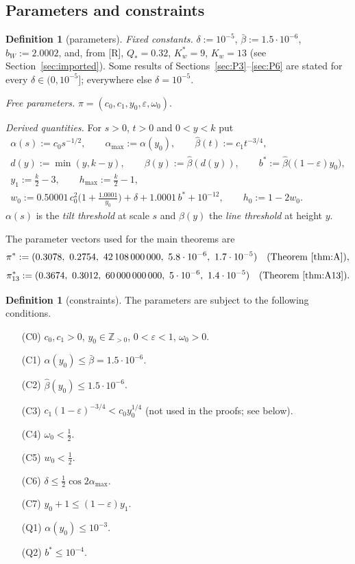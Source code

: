 \documentclass[11pt]{amsart}
\newcommand{\Z}{\mathbb Z}
\newcommand{\amax}{\alpha_{\max}}
\newcommand{\hmax}{h_{\max}}
\theoremstyle{definition}
\newtheorem{definition}[theorem]{Definition}
\theoremstyle{remark}
\numberwithin{equation}{section}
\begin{document}
\subsection{Parameters and constraints}\label{ssec:flows-params}

\begin{definition}[parameters]\label{def:flows-params}
\emph{Fixed constants.} $\delta:=10^{-5}$, $\bar\beta:=1.5\cdot10^{-6}$, $b_W:=2.0002$, and, from [R],
$Q_*=0.32$, $K_w^*=9$, $K_w=13$ (see Section~\ref{sec:imported}). Some results of Sections~\ref{sec:P3}--\ref{sec:P6}
are stated for every $\delta\in(0,10^{-5}]$; everywhere else $\delta=10^{-5}$.

\emph{Free parameters.} $\pi=(c_0,c_1,y_0,\varepsilon,\omega_0)$.

\emph{Derived quantities.} For $s>0$, $t>0$ and $0<y<k$ put
\begin{gather*}
\alpha(s):=c_0s^{-1/2},\qquad \amax:=\alpha(y_0),\qquad \hat\beta(t):=c_1t^{-3/4},\\
d(y):=\min(y,k-y),\qquad \beta(y):=\hat\beta(d(y)),\qquad b^*:=\hat\beta\big((1-\varepsilon)y_0\big),\\
y_1:=\tfrac k2-3,\qquad \hmax:=\tfrac k2-1,\\
w_0:=0.50001\,c_0^2\Big(1+\frac{1.0001}{y_0}\Big)+\delta+1.0001\,b^*+10^{-12},\qquad h_0:=1-2w_0 .
\end{gather*}
$\alpha(s)$ is the \emph{tilt threshold} at scale $s$ and $\beta(y)$ the \emph{line threshold} at height $y$.
\end{definition}

The parameter vectors used for the main theorems are
\[
\pi^*:=(0.3078,\ 0.2754,\ 42\,108\,000\,000,\ 5.8\cdot10^{-6},\ 1.7\cdot10^{-5})\quad\text{(Theorem~\ref{thm:A})},
\]
\[
\pi^*_{13}:=(0.3674,\ 0.3012,\ 60\,000\,000\,000,\ 5\cdot10^{-6},\ 1.4\cdot10^{-5})\quad\text{(Theorem~\ref{thm:A13})}.
\]

\begin{definition}[constraints]\label{def:flows-constraints}
The parameters are subject to the following conditions.
\begin{enumerate}
\item[(C0)] $c_0,c_1>0$, $y_0\in\Z_{>0}$, $0<\varepsilon<1$, $\omega_0>0$.
\item[(C1)] $\alpha(y_0)\le\bar\beta=1.5\cdot10^{-6}$.
\item[(C2)] $\hat\beta(y_0)\le1.5\cdot10^{-6}$.
\item[(C3)] $c_1(1-\varepsilon)^{-3/4}<c_0y_0^{1/4}$ (not used in the proofs; see below).
\item[(C4)] $\omega_0<\frac12$.
\item[(C5)] $w_0<\frac12$.
\item[(C6)] $\delta\le\frac12\cos2\amax$.
\item[(C7)] $y_0+1\le(1-\varepsilon)y_1$.
\item[(Q1)] $\alpha(y_0)\le10^{-3}$.
\item[(Q2)] $b^*\le10^{-4}$.
\end{enumerate}
\end{definition}
\end{document}
